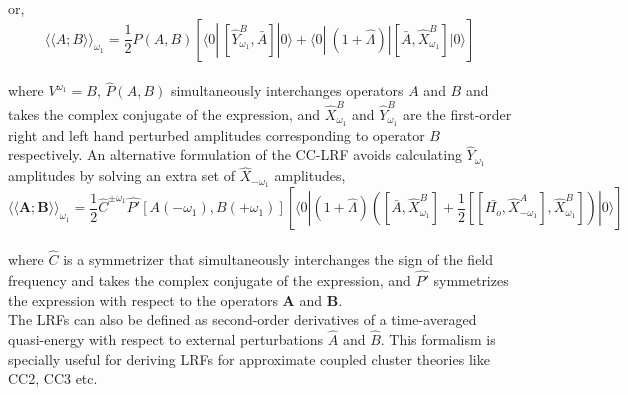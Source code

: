 or,
\begin{equation}
{\langle\langle A;B\rangle\rangle}_{\omega_1} =  \frac{1}{2}\hat{P}(A,B)[\langle 0 | \
[\hat{Y}^{B}_{\omega_1}, \bar{A}]|0\rangle + \langle 0 | \
(1 + \hat{\Lambda})|[\bar{A},\hat{X}^{B}_{\omega_1}]|0\rangle]
\end{equation}
\\
where $V^{\omega_1} = B$, $\hat{P}(A,B)$ simultaneously interchanges operators $A$ and $B$
and takes the complex conjugate of the expression,
and $\hat{X}^{B}_{\omega_1}$ and $\hat{Y}^{B}_{\omega_1}$ are the first-order right 
and left hand perturbed amplitudes corresponding to operator
$B$ respectively. An alternative formulation of the CC-LRF avoids calculating $\hat{Y}_{\omega_1}$
amplitudes by solving an extra set of $\hat{X}_{-\omega_1}$ amplitudes,
\\
\begin{equation}
{\langle\langle\bm{A};\bm{B}\rangle\rangle}_{\omega_1}=
\frac{1}{2}\hat{C}^{\pm\omega_1}\hat{P'}[A(-\omega_1),B(+\omega_1)] \left[
\langle0|(1+\hat{\Lambda})\left( [\bar{A},\hat{X}^B_{\omega_1}] +
\frac{1}{2}[[\bar{H_o},\hat{X}^{A}_{-\omega_1}], \hat{X}^{B}_{\omega_1}]
\right) |0\rangle \right]
\label{Eq:linresp}
\end{equation}
\\
where $\hat{C}$ is a symmetrizer that simultaneously interchanges the sign of the field 
frequency and takes the complex conjugate of the expression, and $\hat{P'}$ symmetrizes 
the expression with respect to the operators $\bm{A}$ and $\bm{B}$.\\
The LRFs can also be defined as second-order derivatives
of a time-averaged quasi-energy with respect to external perturbations $\hat{A}$ and
$\hat{B}$. This formalism is specially useful for deriving LRFs for approximate
coupled cluster theories like CC2, CC3 etc.
